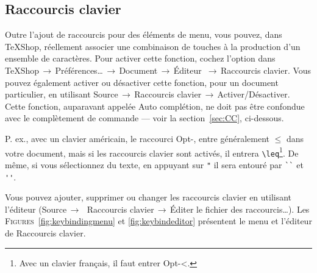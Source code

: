 \documentclass[11pt,french]{article}
\newcommand{\TS}{\textsf{\TeX Shop}}
\newcommand{\cmd}[1]{\textsf{#1}}
\newcommand{\mnu}[1]{\textsf{#1}}
\newcommand{\To}{\,\(\to\)\,}
\begin{document}

\subsection{Raccourcis clavier}

Outre l'ajout de raccourcis pour des éléments de menu, vous pouvez, dans \TS{}, réellement associer une combinaison de touches à la production d'un ensemble de caractères. Pour activer cette fonction, cochez l'option dans  \mnu{TeXShop}\To\mnu{Préférences…}\To\mnu{Document}\To\mnu{Éditeur} \To\mnu{Raccourcis clavier}. Vous pouvez également activer ou désactiver cette fonction, pour un document particulier, en utilisant \mnu{Source}\To\mnu{Raccourcis clavier}\To\mnu{Activer/Désactiver}. Cette fonction, auparavant appelée Auto complétion, ne doit pas être confondue avec le complètement de commande --- voir la section~\ref{sec:CC}, ci-dessous.


P. ex., avec un clavier américain, le raccourci \cmd{Opt-,} entre généralement \texttt{\(\leq\)} dans votre document, mais si les raccourcis clavier sont activés, il entrera \verb|\leq|\footnote{Avec un clavier français, il faut entrer \cmd{Opt-<}.}. De même, si vous sélectionnez du texte, en appuyant sur \verb|"| il sera entouré par \verb|``| et \verb|''|. 


Vous pouvez ajouter, supprimer ou changer les raccourcis clavier en utilisant l'éditeur (\mnu{Source}\To\ \mnu{Raccourcis clavier}\To\mnu{Éditer le fichier des raccourcis…}). Les \textsc{Figures}~\ref{fig:keybindingmenu} et \vref{fig:keybindeditor} présentent le menu et l'éditeur de \mnu{Raccourcis clavier}. 
\end{document}
